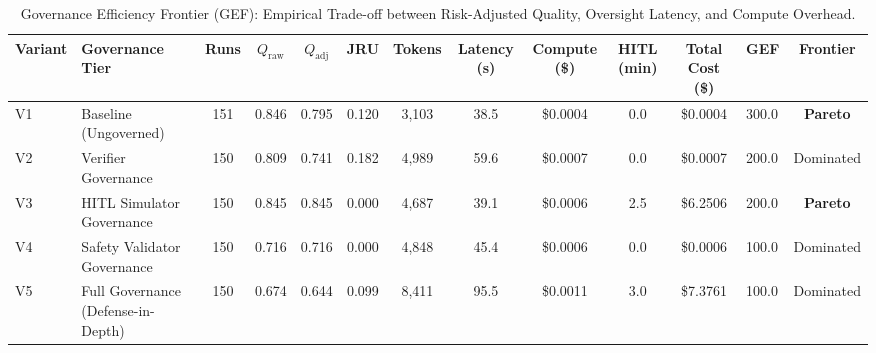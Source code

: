 \begin{table}
\caption{Governance Efficiency Frontier (GEF): Empirical Trade-off between Risk-Adjusted Quality, Oversight Latency, and Compute Overhead.}
\label{tab:gef_frontier}
\begin{tabular}{llccccccccclc}
\toprule
Variant & Governance Tier & Runs & $Q_{\text{raw}}$ & $Q_{\text{adj}}$ & JRU & Tokens & Latency (s) & Compute (\$) & HITL (min) & Total Cost (\$) & GEF & Frontier \\
\midrule
V1 & Baseline (Ungoverned) & 151 & 0.846 & 0.795 & 0.120 & 3,103 & 38.5 & \$0.0004 & 0.0 & \$0.0004 & 300.0 & \textbf{Pareto} \\
V2 & Verifier Governance & 150 & 0.809 & 0.741 & 0.182 & 4,989 & 59.6 & \$0.0007 & 0.0 & \$0.0007 & 200.0 & Dominated \\
V3 & HITL Simulator Governance & 150 & 0.845 & 0.845 & 0.000 & 4,687 & 39.1 & \$0.0006 & 2.5 & \$6.2506 & 200.0 & \textbf{Pareto} \\
V4 & Safety Validator Governance & 150 & 0.716 & 0.716 & 0.000 & 4,848 & 45.4 & \$0.0006 & 0.0 & \$0.0006 & 100.0 & Dominated \\
V5 & Full Governance (Defense-in-Depth) & 150 & 0.674 & 0.644 & 0.099 & 8,411 & 95.5 & \$0.0011 & 3.0 & \$7.3761 & 100.0 & Dominated \\
\bottomrule
\end{tabular}
\end{table}
